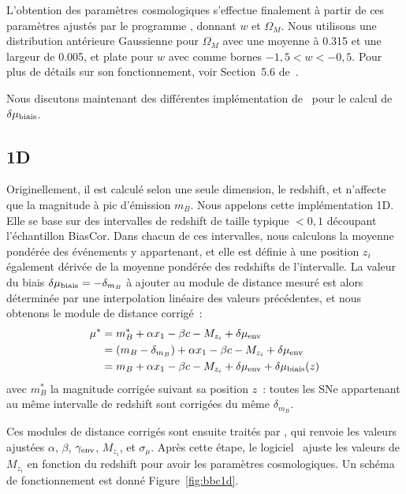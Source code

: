 \documentclass[../main/main.tex]{subfiles}
\begin{document}
L'obtention des paramètres cosmologiques s'effectue finalement à partir de ces
paramètres ajustés par le programme \wfit, donnant $w$ et $\Omega_M$. Nous
utilisons une distribution antérieure Gaussienne pour $\Omega_M$ avec une
moyenne à \num{0.315} et une largeur de \num{0.005}, et plate pour $w$ avec
comme bornes $-1,5 < w < -0,5$. Pour plus de détails sur son fonctionnement,
voir Section~5.6 de~\cite{kessler2017}.

Nous discutons maintenant des différentes implémentation de \bbc\ pour le calcul
de $\delta\mu_{\rm biais}$.

\subsection{\bbc1D}\label{ssec:bbc1D}

Originellement, il est calculé selon une seule dimension, le redshift, et
n'affecte que la magnitude à pic d'émission $m_B$. Nous appelons cette
implémentation \bbc1D. Elle se base sur des intervalles de redshift de taille
typique $< 0,1$ découpant l'échantillon BiasCor. Dans chacun de ces intervalles,
nous calculons la moyenne pondérée des événements y appartenant, et elle est
définie à une position $z_i$ également dérivée de la moyenne pondérée des
redshifts de l'intervalle. La valeur du biais $\delta\mu_{\rm biais} = -
\delta_{m_B}$ à ajouter au module de distance mesuré est alors déterminée par
une interpolation linéaire des valeurs précédentes, et nous obtenons le module
de distance corrigé~:
\begin{align}\label{eq:mu1D}
    \mu^* & = m_B^* + \alpha x_1 - \beta c - M_{z_i}
            + \delta\mu_{\rm env} \nonumber\\
          & = (m_B-\delta_{m_B}) + \alpha x_1 - \beta c - M_{z_i}
            + \delta\mu_{\rm env} \nonumber\\
          & = m_B + \alpha x_1 - \beta c - M_{z_i}
            + \delta\mu_{\rm env} + \delta\mu_{\rm biais}(z)
\end{align}
avec $m_B^*$ la magnitude corrigée suivant sa position $z$~: toutes les SNe
appartenant au même intervalle de redshift sont corrigées du même
$\delta_{m_B}$.

Ces modules de distance corrigés sont ensuite traités par \saltmu, qui renvoie
les valeurs ajustées $\alpha$, $\beta$, $\gamma_{\rm env}$, $M_{z_i}$, et
$\sigma_{\mu}$. Après cette étape, le logiciel \wfit\ ajuste les valeurs de
$M_{z_i}$ en fonction du redshift pour avoir les paramètres cosmologiques. Un
schéma de fonctionnement est donné Figure~\ref{fig:bbc1d}.
\end{document}

